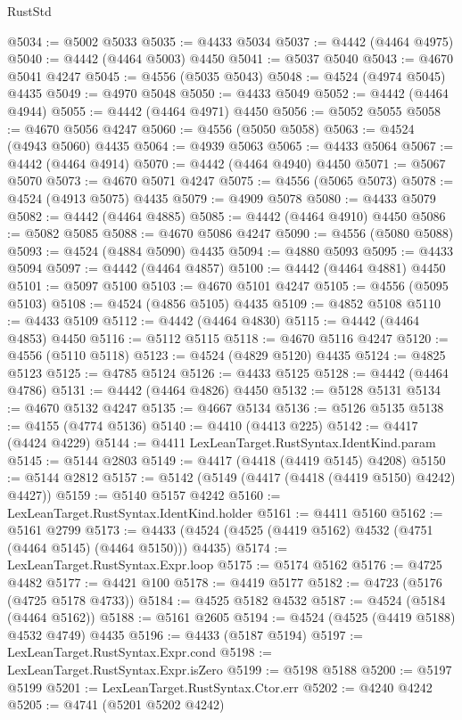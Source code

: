 \begin{lexlean}{RustStd}
\begin{coremodule}
@5034 := @5002 @5033
@5035 := @4433 @5034
@5037 := @4442 (@4464 @4975)
@5040 := @4442 (@4464 @5003) @4450
@5041 := @5037 @5040
@5043 := @4670 @5041 @4247
@5045 := @4556 (@5035 @5043)
@5048 := @4524 (@4974 @5045) @4435
@5049 := @4970 @5048
@5050 := @4433 @5049
@5052 := @4442 (@4464 @4944)
@5055 := @4442 (@4464 @4971) @4450
@5056 := @5052 @5055
@5058 := @4670 @5056 @4247
@5060 := @4556 (@5050 @5058)
@5063 := @4524 (@4943 @5060) @4435
@5064 := @4939 @5063
@5065 := @4433 @5064
@5067 := @4442 (@4464 @4914)
@5070 := @4442 (@4464 @4940) @4450
@5071 := @5067 @5070
@5073 := @4670 @5071 @4247
@5075 := @4556 (@5065 @5073)
@5078 := @4524 (@4913 @5075) @4435
@5079 := @4909 @5078
@5080 := @4433 @5079
@5082 := @4442 (@4464 @4885)
@5085 := @4442 (@4464 @4910) @4450
@5086 := @5082 @5085
@5088 := @4670 @5086 @4247
@5090 := @4556 (@5080 @5088)
@5093 := @4524 (@4884 @5090) @4435
@5094 := @4880 @5093
@5095 := @4433 @5094
@5097 := @4442 (@4464 @4857)
@5100 := @4442 (@4464 @4881) @4450
@5101 := @5097 @5100
@5103 := @4670 @5101 @4247
@5105 := @4556 (@5095 @5103)
@5108 := @4524 (@4856 @5105) @4435
@5109 := @4852 @5108
@5110 := @4433 @5109
@5112 := @4442 (@4464 @4830)
@5115 := @4442 (@4464 @4853) @4450
@5116 := @5112 @5115
@5118 := @4670 @5116 @4247
@5120 := @4556 (@5110 @5118)
@5123 := @4524 (@4829 @5120) @4435
@5124 := @4825 @5123
@5125 := @4785 @5124
@5126 := @4433 @5125
@5128 := @4442 (@4464 @4786)
@5131 := @4442 (@4464 @4826) @4450
@5132 := @5128 @5131
@5134 := @4670 @5132 @4247
@5135 := @4667 @5134
@5136 := @5126 @5135
@5138 := @4155 (@4774 @5136)
@5140 := @4410 (@4413 @225)
@5142 := @4417 (@4424 @4229)
@5144 := @4411 LexLeanTarget.RustSyntax.IdentKind.param
@5145 := @5144 @2803
@5149 := @4417 (@4418 (@4419 @5145) @4208)
@5150 := @5144 @2812
@5157 := @5142 (@5149 (@4417 (@4418 (@4419 @5150) @4242) @4427))
@5159 := @5140 @5157 @4242
@5160 := LexLeanTarget.RustSyntax.IdentKind.holder
@5161 := @4411 @5160
@5162 := @5161 @2799
@5173 := @4433 (@4524 (@4525 (@4419 @5162) @4532 (@4751 (@4464 @5145) (@4464 @5150))) @4435)
@5174 := LexLeanTarget.RustSyntax.Expr.loop
@5175 := @5174 @5162
@5176 := @4725 @4482
@5177 := @4421 @100
@5178 := @4419 @5177
@5182 := @4723 (@5176 (@4725 @5178 @4733))
@5184 := @4525 @5182 @4532
@5187 := @4524 (@5184 (@4464 @5162))
@5188 := @5161 @2605
@5194 := @4524 (@4525 (@4419 @5188) @4532 @4749) @4435
@5196 := @4433 (@5187 @5194)
@5197 := LexLeanTarget.RustSyntax.Expr.cond
@5198 := LexLeanTarget.RustSyntax.Expr.isZero
@5199 := @5198 @5188
@5200 := @5197 @5199
@5201 := LexLeanTarget.RustSyntax.Ctor.err
@5202 := @4240 @4242
@5205 := @4741 (@5201 @5202 @4242)

\end{coremodule}
\end{lexlean}
